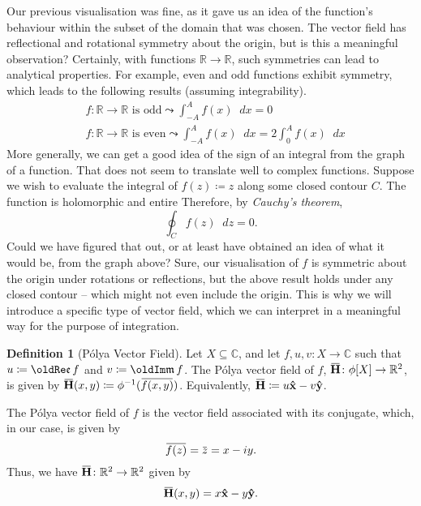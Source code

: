 \documentclass[a4paper]{article}
\newcommand*\diff{\mathop{}\!d} %
\newcommand{\R}{\mathbb{R}}
\newcommand{\C}{\mathbb{C}}
\renewcommand{\Im}{\mathop{\oldIm\mathfrak{m}}}
\renewcommand{\Re}{\mathop{\oldRe\mathfrak{e}}}
\newcommand{\overbar}[1]{\mkern 1.5mu\overline{\mkern-1.5mu#1\mkern-1.5mu}\mkern 1.5mu}
\theoremstyle{definition}
\newtheorem{definition}{Definition}
\begin{document}
Our previous visualisation was fine, as it gave us an idea of the function's behaviour within the subset of the domain that was chosen.
The vector field has reflectional and rotational symmetry about the origin, but is this a meaningful observation?
Certainly, with functions $\R \to \R$, such symmetries can lead to analytical properties.
For example, even and odd functions exhibit symmetry, which leads to the following results (assuming integrability).
\begin{align*}
     & f \colon \R \to \R \text{ is odd} \leadsto \int_{-A}^{A} f(x) \diff x = 0                            \\
     & f \colon \R \to \R \text{ is even} \leadsto \int_{-A}^{A} f(x) \diff x = 2 \int_{0}^{A} f(x) \diff x
\end{align*}
More generally, we can get a good idea of the sign of an integral from the graph of a function.
That does not seem to translate well to complex functions.
Suppose we wish to evaluate the integral of $f(z) \coloneq z$ along some closed contour $C$.
The function is holomorphic and entire
Therefore, by \emph{Cauchy's theorem},
\begin{equation*}
    \oint_C f(z) \diff z = 0.
\end{equation*}
Could we have figured that out, or at least have obtained an idea of what it would be, from the graph above?
Sure, our visualisation of $f$ is symmetric about the origin under rotations or reflections, but the above result holds under any closed contour -- which might not even include the origin.
This is why we will introduce a specific type of vector field, which we can interpret in a meaningful way for the purpose of integration.
\begin{definition}[P\'olya Vector Field]
    Let $X \subseteq \C$, and let $f,u,v \colon X \to \C$ such that $u \coloneq \Re f$ and $v \coloneq \Im f$.
    The P\'olya vector field of $f$, $\mathbf{\overbar{H}} \colon \phi[X] \to \R^2$, is given by $\mathbf{\overbar{H}} (x,y) \coloneq \phi^{-1}(\overbar{f(x,y)})$.
    Equivalently, $\mathbf{\overbar{H}} \coloneq u\mathbf{\hat{x}} - v\mathbf{\hat{y}}$.
\end{definition}
The P\'olya vector field of $f$ is the vector field associated with its conjugate, which, in our case, is given by
\begin{equation*}
    \overbar{f(z)} = \overbar{z} = x - iy.
\end{equation*}
Thus, we have $\mathbf{\overbar{H}} \colon \R^2 \to \R^2$ given by
\begin{equation*}
    \mathbf{\overbar{H}}(x,y) = x \mathbf{\hat{x}} - y \mathbf{\hat{y}}.
\end{equation*}
\end{document}
